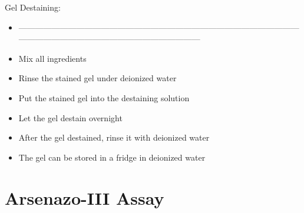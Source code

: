 Gel Destaining:
\begin{itemize}
    \item ------------------------------------------------------------------------------------------------------------------------------------------------------------------------
    \item Mix all ingredients
    \item Rinse the stained gel under deionized water
    \item Put the stained gel into the destaining solution
    \item Let the gel destain overnight
    \item After the gel destained, rinse it with deionized water
    \item The gel can be stored in a fridge in deionized water
\end{itemize}

\section{Arsenazo-III Assay\authorA}

